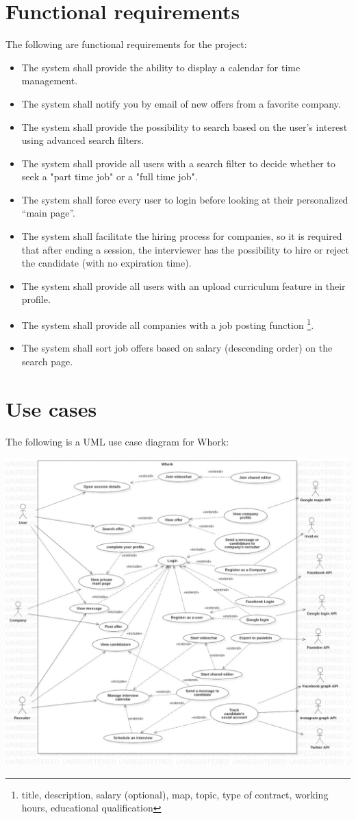 \documentclass[12pt, a4paper]{article}
\begin{document}
\newpage
\section{Functional requirements}
The following are functional requirements for the project:
\begin{itemize}
	\item The system shall provide the ability to display a calendar for time management.
	\item The system shall notify you by email of new offers from a favorite company.
	\item The system shall provide the possibility to search based on the user's interest using advanced search filters.
	\item The system shall provide all users with a search filter to decide whether to seek a
	"part time job" or a "full time job".
	\item The system shall force every user to login before looking at their personalized “main page”.
	\item The system shall facilitate the hiring process for companies, so it is required that after ending a session, 
	the interviewer has the possibility to hire or reject the candidate (with no expiration time).
	\item The system shall provide all users with an upload curriculum feature in their profile.
	\item The system shall provide all companies with a job posting function
	\footnote{title, description, salary (optional), map, topic, type of contract, working hours, educational qualification}.
	\item The system shall sort job offers based on salary (descending order) on the search page.
\end{itemize}

\newpage
\section{Use cases}
The following is a UML use case diagram for Whork:

\includegraphics{diagrams/project/usecase_scaled.jpg}
\end{document}
